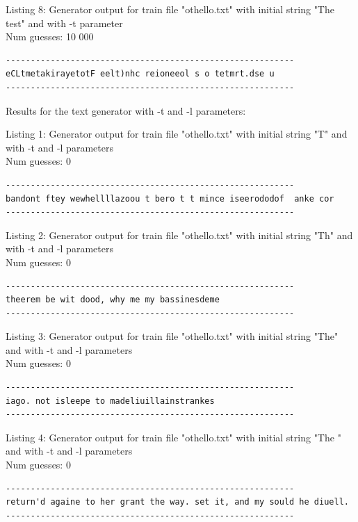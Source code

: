 \documentclass{article}
\begin{document}
Listing 8: Generator output for train file "othello.txt" with initial string "The test" and with -t parameter
\\Num guesses: 10 000

\begin{lstlisting}
----------------------------------------------------------
eCLtmetakirayetotF eelt)nhc reioneeol s o tetmrt.dse u
----------------------------------------------------------
\end{lstlisting}


Results for the text generator with -t and -l parameters:


\hfill

Listing 1: Generator output for train file "othello.txt" with initial string "T" and with -t and -l parameters
\\Num guesses: 0

\begin{lstlisting}
----------------------------------------------------------
bandont ftey wewhellllazoou t bero t t mince iseerododof  anke cor
----------------------------------------------------------
\end{lstlisting}

Listing 2: Generator output for train file "othello.txt" with initial string "Th" and with -t and -l parameters
\\Num guesses: 0

\begin{lstlisting}
----------------------------------------------------------
theerem be wit dood, why me my bassinesdeme
----------------------------------------------------------
\end{lstlisting}

Listing 3: Generator output for train file "othello.txt" with initial string "The" and with -t and -l parameters
\\Num guesses: 0

\begin{lstlisting}
----------------------------------------------------------
iago. not isleepe to madeliuillainstrankes
----------------------------------------------------------
\end{lstlisting}

Listing 4: Generator output for train file "othello.txt" with initial string "The " and with -t and -l parameters
\\Num guesses: 0

\begin{lstlisting}
----------------------------------------------------------
return'd againe to her grant the way. set it, and my sould he diuell.
----------------------------------------------------------
\end{lstlisting}
\end{document}
